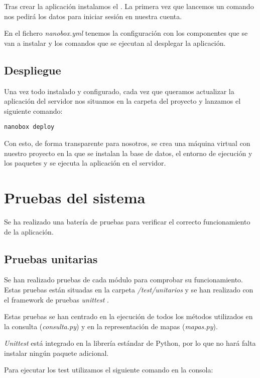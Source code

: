 Tras crear la aplicación instalamos el . La primera vez que lancemos un comando nos pedirá los datos para iniciar sesión en nuestra cuenta.

En el fichero \textit{nanobox.yml} tenemos la configuración con los componentes que se van a instalar y los comandos que se ejecutan al desplegar la aplicación.

\subsection{Despliegue}


Una vez todo instalado y configurado, cada vez que queramos actualizar la aplicación del servidor nos situamos en la carpeta del proyecto y lanzamos el siguiente comando:

\begin{lstlisting}
nanobox deploy
\end{lstlisting}

Con esto, de forma transparente para nosotros, se crea una máquina virtual con nuestro proyecto en la que se instalan la base de datos, el entorno de ejecución y los paquetes y se ejecuta la aplicación en el servidor.

\section{Pruebas del sistema}

Se ha realizado una batería de pruebas para verificar el correcto funcionamiento de la aplicación.

\subsection{Pruebas unitarias}

Se han realizado pruebas de cada módulo para comprobar su funcionamiento. Estas pruebas están situadas en la carpeta \textit{/test/unitarios} y se han realizado con el framework de pruebas \textit{unittest} \cite{misc:unittest}.

Estas pruebas se han centrado en la ejecución de todos los métodos utilizados en la consulta (\textit{consulta.py}) y en la representación de mapas (\textit{mapas.py}).

\textit{Unittest} está integrado en la librería estándar de Python, por lo que no hará falta instalar ningún paquete adicional. 

Para ejecutar los test utilizamos el siguiente comando en la consola:


